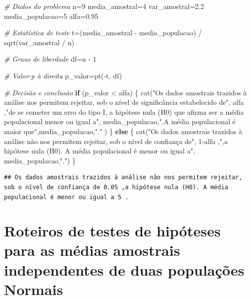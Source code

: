 \documentclass[
]{book}
\newenvironment{Shaded}{\begin{snugshade}}{\end{snugshade}}
\newcommand{\CommentTok}[1]{\textcolor[rgb]{0.56,0.35,0.01}{\textit{#1}}}
\newcommand{\ControlFlowTok}[1]{\textcolor[rgb]{0.13,0.29,0.53}{\textbf{#1}}}
\newcommand{\DecValTok}[1]{\textcolor[rgb]{0.00,0.00,0.81}{#1}}
\newcommand{\FloatTok}[1]{\textcolor[rgb]{0.00,0.00,0.81}{#1}}
\newcommand{\FunctionTok}[1]{\textcolor[rgb]{0.00,0.00,0.00}{#1}}
\newcommand{\NormalTok}[1]{#1}
\newcommand{\OtherTok}[1]{\textcolor[rgb]{0.56,0.35,0.01}{#1}}
\newcommand{\SpecialCharTok}[1]{\textcolor[rgb]{0.00,0.00,0.00}{#1}}
\newcommand{\StringTok}[1]{\textcolor[rgb]{0.31,0.60,0.02}{#1}}
\begin{document}
\begin{Shaded}
\begin{Highlighting}[]
\CommentTok{\# Dados do problema}
\NormalTok{n}\OtherTok{=}\DecValTok{9}
\NormalTok{media\_amostral}\OtherTok{=}\DecValTok{4}
\NormalTok{var\_amostral}\OtherTok{=}\FloatTok{2.2}
\NormalTok{media\_populacao}\OtherTok{=}\DecValTok{5}
\NormalTok{alfa}\OtherTok{=}\FloatTok{0.95}

\CommentTok{\# Estatística de teste}
\NormalTok{t}\OtherTok{=}\NormalTok{(media\_amostral }\SpecialCharTok{{-}}\NormalTok{ media\_populacao) }\SpecialCharTok{/} \FunctionTok{sqrt}\NormalTok{(var\_amostral }\SpecialCharTok{/}\NormalTok{ n)}

\CommentTok{\# Graus de liberdade}
\NormalTok{df}\OtherTok{=}\NormalTok{n }\SpecialCharTok{{-}} \DecValTok{1}

\CommentTok{\# Valor{-}p à direita}
\NormalTok{p\_valor}\OtherTok{=}\FunctionTok{pt}\NormalTok{(}\SpecialCharTok{{-}}\NormalTok{t, df)}


\CommentTok{\# Decisão e conclusão}
\ControlFlowTok{if}\NormalTok{ (p\_valor }\SpecialCharTok{\textless{}}\NormalTok{ alfa) \{}
  \FunctionTok{cat}\NormalTok{(}\StringTok{"Os dados amostrais trazidos à análise nos permitem rejeitar, sob o nível de significância estabelecido de"}\NormalTok{, alfa ,}\StringTok{"de se cometer um erro do tipo I, a hipótese nula (H0) que afirma ser a média populacional menor ou igual a"}\NormalTok{, media\_populacao,}\StringTok{".A média populacional  é maior que"}\NormalTok{,media\_populacao,}\StringTok{"."}\NormalTok{ )}
\NormalTok{\} }\ControlFlowTok{else}\NormalTok{ \{}
  \FunctionTok{cat}\NormalTok{(}\StringTok{"Os dados amostrais trazidos à análise não nos permitem rejeitar, sob o nível de confiança de"}\NormalTok{, }\DecValTok{1}\SpecialCharTok{{-}}\NormalTok{alfa ,}\StringTok{",a hipótese nula (H0). A média populacional é menor ou igual a"}\NormalTok{, media\_populacao,}\StringTok{"."}\NormalTok{)}
\NormalTok{\}}
\end{Highlighting}
\end{Shaded}

\begin{verbatim}
## Os dados amostrais trazidos à análise não nos permitem rejeitar, sob o nível de confiança de 0.05 ,a hipótese nula (H0). A média populacional é menor ou igual a 5 .
\end{verbatim}

\hfill\break

\hypertarget{roteiros-de-testes-de-hipuxf3teses-para-as-muxe9dias-amostrais-independentes-de-duas-populauxe7uxf5es-normais}{%
\section{Roteiros de testes de hipóteses para as médias amostrais independentes de duas populações Normais}\label{roteiros-de-testes-de-hipuxf3teses-para-as-muxe9dias-amostrais-independentes-de-duas-populauxe7uxf5es-normais}}
\end{document}
